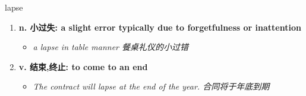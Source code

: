 
\begin{frame}
{\huge lapse}
\begin{center}
\begin{enumerate}\Large
  \item \textbf{n. 小过失: a slight error typically due to forgetfulness or inattention}
  \begin{itemize}
    \item \em{\Large{a lapse in table manner 餐桌礼仪的小过错}}
  \end{itemize}
  \item \textbf{v. 结束,终止: to come to an end}
  \begin{itemize}
    \item \em{\Large{The contract will lapse at the end of the year. 合同将于年底到期}}
  \end{itemize}
\end{enumerate}
\end{center}
\end{frame}
